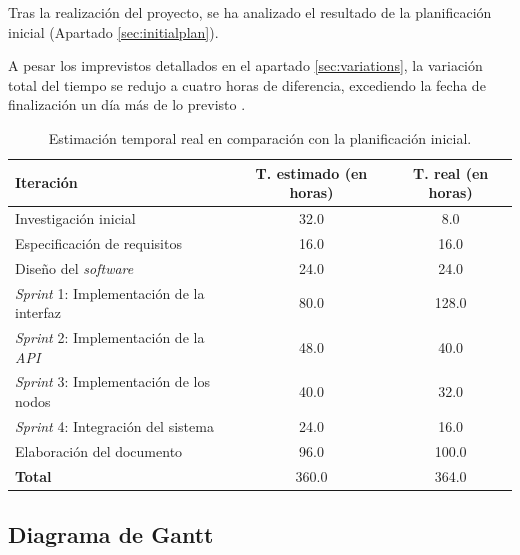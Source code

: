 Tras la realización del proyecto, se ha analizado el resultado de la planificación inicial (Apartado \ref{sec:initialplan}).\sn

A pesar los imprevistos detallados en el apartado \ref{sec:variations}, la variación total del tiempo se redujo a cuatro horas de diferencia, excediendo la fecha de finalización un día más de lo previsto .\sn

\begin{table}[H]
    \begin{center}
        \begin{tabular}{| l | c | c |}
            \hline
            \textbf{Iteración} & \textbf{T. estimado} (en horas) &  \textbf{T. real} (en horas) \\
            \hline
            Investigación inicial           & 32.0 & \cellcolor{green!10} 8.0 \\ \hline
            Especificación de requisitos    & 16.0 & 16.0 \\ \hline
            Diseño del \textit{software}    & 24.0 & 24.0 \\ \hline
            \textit{Sprint} 1: Implementación de la interfaz & 80.0 & \cellcolor{red!10} 128.0 \\ \hline
            \textit{Sprint} 2: Implementación de la \textit{API} & 48.0 & \cellcolor{green!10} 40.0 \\ \hline
            \textit{Sprint} 3: Implementación de los nodos & 40.0 & \cellcolor{green!10} 32.0 \\ \hline
            \textit{Sprint} 4: Integración del sistema & 24.0 & \cellcolor{green!10} 16.0 \\ \hline
            Elaboración del documento       & 96.0 & \cellcolor{red!10} 100.0 \\ \hline
            \textbf{Total}                  & 360.0 & \cellcolor{red!10} 364.0  \\ \hline
        \end{tabular}
    \end{center}
    \caption{Estimación temporal real en comparación con la planificación inicial.}
    \label{tab:realplan}
\end{table}
\vspace{1cm}

\subsection{Diagrama de Gantt} \label{sub:realgantt}

